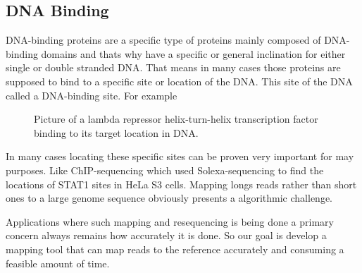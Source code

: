 \documentclass{standalone}
\begin{document}
\subsection{DNA Binding}
DNA-binding proteins are a specific type of proteins mainly composed of DNA-binding domains and thats why have a specific or general inclination for either single or double stranded DNA. That means in many cases those proteins are supposed to bind to a specific site or location of the DNA. This site of the DNA called a DNA-binding site. For example 
\begin{figure}[ht]
	\centering
	\caption{Picture of a lambda repressor helix-turn-helix transcription factor binding to its target location in DNA.}
	\label{fig:DNAB}
\end{figure}
\par 
In many cases locating these specific sites can be proven very important for may purposes. Like ChIP-sequencing\cite{dnaC} which used Solexa-sequencing\cite{dnaB} to find the locations of STAT1 sites in HeLa S3 cells\cite{dnaH}. Mapping longs reads rather than short ones to a large genome sequence obviously presents a algorithmic challenge.
\par 
Applications where such mapping and resequencing is being done a primary concern always remains how accurately it is done. So our goal is develop a mapping tool that can map reads to the reference accurately and consuming a feasible amount of time.
\end{document}
